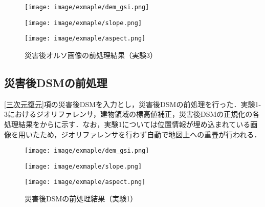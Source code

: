     \begin{figure}[t]
      \begin{minipage}[c]{0.329\hsize}
        \centering
        \texttt{[image: image/exmaple/dem\_gsi.png]}
      \end{minipage}
      \begin{minipage}[c]{0.329\hsize}
        \centering
        \texttt{[image: image/exmaple/slope.png]}
      \end{minipage}
      \begin{minipage}[c]{0.329\hsize}
        \centering
        \texttt{[image: image/exmaple/aspect.png]}
      \end{minipage}
      \caption{災害後オルソ画像の前処理結果（実験3）}
      \label{災害後オルソ画像の前処理結果（実験3）}
    \end{figure}


    \subsection{災害後DSMの前処理}
      \ref{三次元復元}項の災害後DSMを入力とし，災害後DSMの前処理を行った．実験1-3におけるジオリファレンサ，建物領域の標高値補正，災害後DSMの正規化の各処理結果をからに示す．なお，実験1については位置情報が埋め込まれている画像を用いたため，ジオリファレンサを行わず自動で地図上への重畳が行われる．

      \begin{figure}[t]
        \begin{minipage}[c]{0.329\hsize}
          \centering
          \texttt{[image: image/exmaple/dem\_gsi.png]}
        \end{minipage}
        \begin{minipage}[c]{0.329\hsize}
          \centering
          \texttt{[image: image/exmaple/slope.png]}
        \end{minipage}
        \begin{minipage}[c]{0.329\hsize}
          \centering
          \texttt{[image: image/exmaple/aspect.png]}
        \end{minipage}
        \caption{災害後DSMの前処理結果（実験1）}
        \label{災害後DSMの前処理結果（実験1）}
      \end{figure}
  
